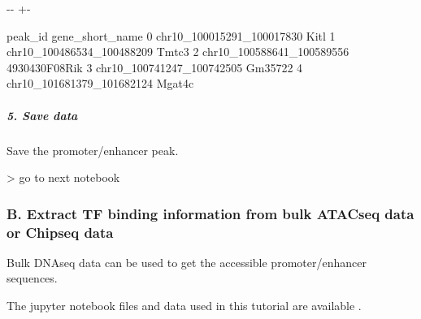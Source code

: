 \documentclass[letterpaper,10pt,english]{sphinxmanual}
\newlength\nbsphinxcodecellspacing
\begin{document}
{

\kern-\sphinxverbatimsmallskipamount\kern-\baselineskip
\kern+\FrameHeightAdjust\kern-\fboxrule
\vspace{\nbsphinxcodecellspacing}

\begin{sphinxVerbatim}[commandchars=\\\{\}]
\llap{\color{nbsphinxout}[10]:\,\hspace{\fboxrule}\hspace{\fboxsep}}                     peak\_id gene\_short\_name
0  chr10\_100015291\_100017830            Kitl
1  chr10\_100486534\_100488209           Tmtc3
2  chr10\_100588641\_100589556   4930430F08Rik
3  chr10\_100741247\_100742505         Gm35722
4  chr10\_101681379\_101682124          Mgat4c
\end{sphinxVerbatim}
}


\subparagraph{5. Save data}
\label{\detokenize{notebooks/01_ATAC-seq_data_processing/option1_scATAC-seq_data_analysis_with_cicero/02_preprocess_peak_data:5.-Save-data}}
Save the promoter/enhancer peak.

{
\begin{sphinxVerbatim}[commandchars=\\\{\}]
\llap{\color{nbsphinxin}[11]:\,\hspace{\fboxrule}\hspace{\fboxsep}}
\end{sphinxVerbatim}
}

\sphinxhyphen{}\textgreater{} go to next notebook


\subsubsection{B. Extract TF binding information from bulk ATAC\sphinxhyphen{}seq data or Chip\sphinxhyphen{}seq data}
\label{\detokenize{tutorials/atac:b-extract-tf-binding-information-from-bulk-atac-seq-data-or-chip-seq-data}}
Bulk DNA\sphinxhyphen{}seq data can be used to get the accessible promoter/enhancer sequences.

The jupyter notebook files and data used in this tutorial are available  .
\end{document}

